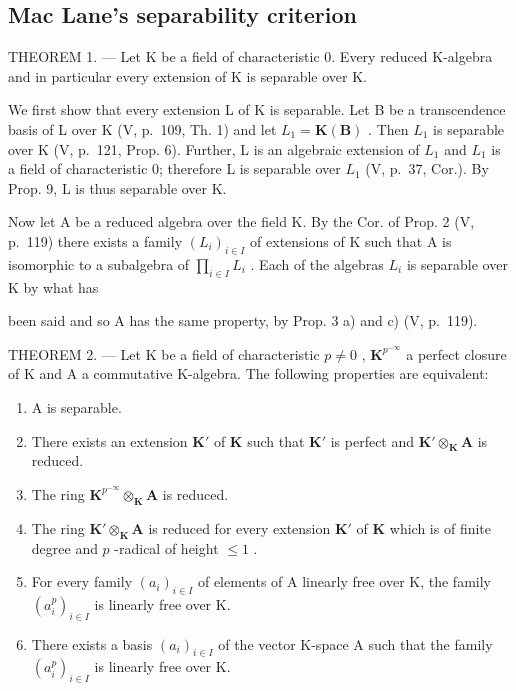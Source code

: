 \subsection{Mac Lane's separability criterion}

THEOREM 1. --- Let K be a field of characteristic 0. Every reduced K-algebra and in particular every extension of K is separable over K.

We first show that every extension L of K is separable. Let B be a transcendence basis of L over K (V, p.~109, Th. 1) and let \(L_{1} = \mathbf{K}(\mathbf{B})\) . Then \(L_{1}\) is separable over K (V, p.~121, Prop. 6). Further, L is an algebraic extension of \(L_{1}\) and \(L_{1}\) is a field of characteristic 0; therefore L is separable over \(L_{1}\) (V, p.~37, Cor.). By Prop. 9, L is thus separable over K.

Now let A be a reduced algebra over the field K. By the Cor. of Prop. 2 (V, p.~119) there exists a family \((L_{i})_{i \in I}\) of extensions of K such that A is isomorphic to a subalgebra of \(\prod_{i \in I} L_{i}\) . Each of the algebras \(L_{i}\) is separable over K by what has

been said and so A has the same property, by Prop. 3 a) and c) (V, p.~119).

THEOREM 2. --- Let K be a field of characteristic \(p \neq 0\) , \(\mathbf{K}^{p^{-\infty}}\) a perfect closure of K and A a commutative K-algebra. The following properties are equivalent:

\begin{enumerate}
\def\labelenumi{\alph{enumi})}
\item
  A is separable.
\item
  There exists an extension \(\mathbf{K}'\) of \(\mathbf{K}\) such that \(\mathbf{K}'\) is perfect and \(\mathbf{K}' \otimes_{\mathbf{K}} \mathbf{A}\) is reduced.
\item
  The ring \(\mathbf{K}^{p^{-\infty}}\otimes_{\mathbf{K}}\mathbf{A}\) is reduced.
\item
  The ring \(\mathbf{K}' \otimes_{\mathbf{K}} \mathbf{A}\) is reduced for every extension \(\mathbf{K}'\) of \(\mathbf{K}\) which is of finite degree and \(p\) -radical of height \(\leqslant 1\) .
\item
  For every family \((a_{i})_{i\in I}\) of elements of A linearly free over K, the family \((a_{i}^{p})_{i\in I}\) is linearly free over K.
\item
  There exists a basis \((a_{i})_{i\in I}\) of the vector K-space A such that the family \((a_{i}^{p})_{i\in I}\) is linearly free over K.
\end{enumerate}

